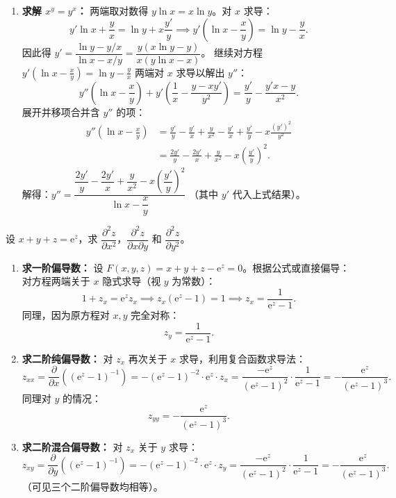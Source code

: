 \documentclass[lang=cn,11pt]{elegantbook}
\begin{document}
\begin{solution}
\begin{enumerate}
  \item[(4)] \textbf{求解 $x^y = y^x$：}
  两端取对数得 $y\ln x = x\ln y$。对 $x$ 求导：
  \[ y'\ln x + \frac{y}{x} = \ln y + x\frac{y'}{y} \implies y'\left(\ln x - \frac{x}{y}\right) = \ln y - \frac{y}{x}. \]
  因此得 $y' = \dfrac{\ln y - y/x}{\ln x - x/y} = \dfrac{y(x\ln y - y)}{x(y\ln x - x)}$。
  继续对方程 $y'\left(\ln x - \frac{x}{y}\right) = \ln y - \frac{y}{x}$ 两端对 $x$ 求导以解出 $y''$：
  \[ y''\left(\ln x - \frac{x}{y}\right) + y'\left(\frac{1}{x} - \frac{y - xy'}{y^2}\right) = \frac{y'}{y} - \frac{y'x - y}{x^2}. \]
  展开并移项合并含 $y''$ 的项：
  \begin{align*}
  y''\left(\ln x - \frac{x}{y}\right) &= \frac{y'}{y} - \frac{y'}{x} + \frac{y}{x^2} - \frac{y'}{x} + \frac{y'}{y} - x\frac{(y')^2}{y^2} \\
  &= \frac{2y'}{y} - \frac{2y'}{x} + \frac{y}{x^2} - x\left(\frac{y'}{y}\right)^2.
  \end{align*}
  解得：$y'' = \dfrac{\dfrac{2y'}{y} - \dfrac{2y'}{x} + \dfrac{y}{x^2} - x\left(\dfrac{y'}{y}\right)^2}{\ln x - \dfrac{x}{y}}$ （其中 $y'$ 代入上式结果）。
\end{enumerate}
\end{solution}

\begin{exercise}[三元单方程隐函数的二阶偏导数]
设 $x + y + z = \mathrm{e}^z$，求 $\dfrac{\partial^2 z}{\partial x^2}$，$\dfrac{\partial^2 z}{\partial x\partial y}$ 和 $\dfrac{\partial^2 z}{\partial y^2}$。
\end{exercise}
\begin{solution}
\begin{enumerate}
  \item \textbf{求一阶偏导数：}
  设 $F(x,y,z) = x+y+z-\mathrm{e}^z = 0$。根据公式或直接偏导：
  对方程两端关于 $x$ 隐式求导（视 $y$ 为常数）：
  \[ 1 + z_x = \mathrm{e}^z z_x \implies z_x(\mathrm{e}^z - 1) = 1 \implies z_x = \frac{1}{\mathrm{e}^z - 1}. \]
  同理，因为原方程对 $x, y$ 完全对称：
  \[ z_y = \frac{1}{\mathrm{e}^z - 1}. \]

  \item \textbf{求二阶纯偏导数：}
  对 $z_x$ 再次关于 $x$ 求导，利用复合函数求导法：
  \[ z_{xx} = \frac{\partial}{\partial x}\left( (\mathrm{e}^z - 1)^{-1} \right) = -(\mathrm{e}^z - 1)^{-2} \cdot \mathrm{e}^z \cdot z_x = \frac{-\mathrm{e}^z}{(\mathrm{e}^z - 1)^2} \cdot \frac{1}{\mathrm{e}^z - 1} = -\frac{\mathrm{e}^z}{(\mathrm{e}^z - 1)^3}. \]
  同理对 $y$ 的情况：
  \[ z_{yy} = -\frac{\mathrm{e}^z}{(\mathrm{e}^z - 1)^3}. \]

  \item \textbf{求二阶混合偏导数：}
  对 $z_x$ 关于 $y$ 求导：
  \[ z_{xy} = \frac{\partial}{\partial y}\left( (\mathrm{e}^z - 1)^{-1} \right) = -(\mathrm{e}^z - 1)^{-2} \cdot \mathrm{e}^z \cdot z_y = \frac{-\mathrm{e}^z}{(\mathrm{e}^z - 1)^2} \cdot \frac{1}{\mathrm{e}^z - 1} = -\frac{\mathrm{e}^z}{(\mathrm{e}^z - 1)^3}. \]
  （可见三个二阶偏导数均相等）。
\end{enumerate}
\end{solution}
\end{document}
